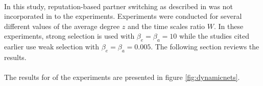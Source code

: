 \documentclass{article}
\begin{document}
	\paragraph{}In this study, reputation-based partner switching as described in \cite{Fu2008} was not incorporated in to the experiments.  Experiments were conducted for several different values of the average degree $z$ and the time scales ratio $W$.  In these experiments, strong selection is used with $\beta_e=\beta_a=10$ while the studies cited earlier use weak selection with $\beta_e=\beta_a=0.005$.  The following section reviews the results.
	\paragraph{} The results for of the experiments are presented in figure \ref{fig:dynamicnets}.
\end{document}
